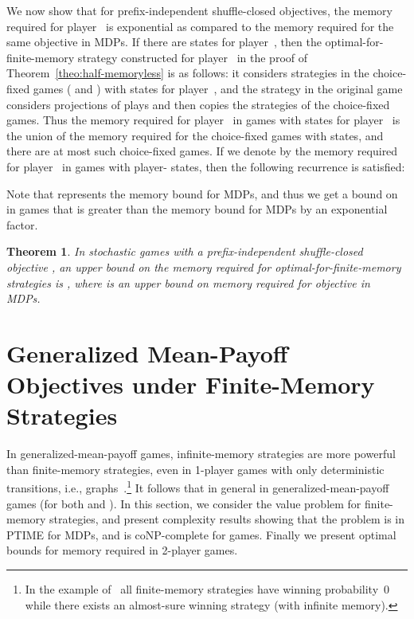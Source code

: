 \documentclass{article}
\newtheorem{theorem}{Theorem}
\newcommand{\half}{}
\begin{document}
\smallskip{} 
We now show that for prefix-independent shuffle-closed objectives, 
the memory required for player~ is exponential as compared
to the memory required for the same objective in MDPs.
If there are  states for player~, then the optimal-for-finite-memory 
strategy  constructed for player~ in the proof of Theorem~\ref{theo:half-memoryless}
is as follows: it considers strategies in the choice-fixed games 
( and ) with  states for player~, and the strategy in 
the original game considers projections of plays and then copies the strategies 
of the choice-fixed games. 
Thus the memory required for player~ in games with  states for player~ is the union
of the memory required for the choice-fixed games with  states, and there 
are at most  such choice-fixed games.
If we denote by  the memory required for player~ in games with  
player- states, then the following recurrence is satisfied:

Note that  represents the memory bound for MDPs, and thus we get a bound on 
 in games that is greater than the 
memory bound for MDPs by an exponential factor.



\begin{theorem}\label{theo:membou}
In stochastic games with a prefix-independent shuffle-closed objective , 
an upper bound on the memory required for optimal-for-finite-memory strategies
is , where  is an upper bound on memory
required for objective  in MDPs.
\end{theorem}



\section{Generalized Mean-Payoff Objectives under Finite-Memory Strategies}\label{sec:finmem}

In generalized-mean-payoff games, infinite-memory strategies are more powerful 
than finite-memory strategies, even in 1-player games with only deterministic 
transitions, i.e., graphs~\cite[Lemma~7]{VCDHRR15}.\footnote{In the example of~\cite[Lemma~7]{VCDHRR15}
all finite-memory strategies have winning probability~0 while there exists an almost-sure 
winning strategy (with infinite memory).}
It follows that in general  in generalized-mean-payoff games
(for both  and ).
In this section, we consider the value problem for finite-memory
strategies, and present complexity results showing that the problem is in PTIME for
MDPs, and is coNP-complete for games.
Finally we present optimal bounds for memory required in 2\half-player games.
\end{document}
